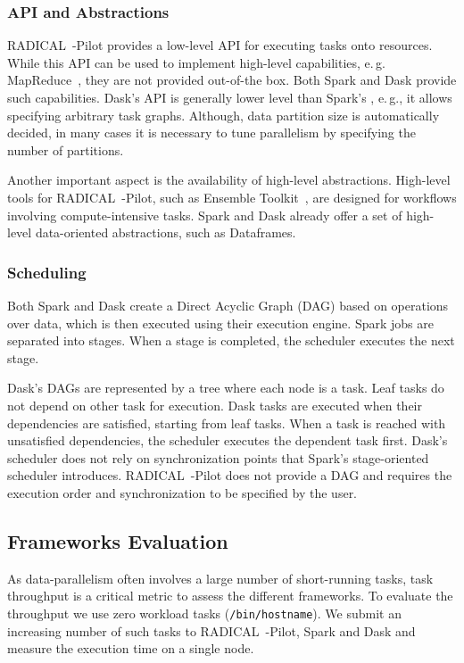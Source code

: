 \subsubsection*{API and Abstractions} 
RADICAL~-Pilot provides a low-level API for executing tasks onto resources.
While this API can be used to implement high-level capabilities, e.\,g. MapReduce~\cite{mantha2012pilot}, they are not provided out-of-the box.
Both Spark and Dask provide such capabilities.
Dask's API is generally lower level than Spark's , e.\,g., it allows specifying arbitrary task graphs.
Although, data partition size is automatically decided, in many cases it is necessary to tune parallelism by specifying the number of partitions.

Another important aspect is the availability of high-level abstractions.
High-level tools for RADICAL~-Pilot, such as Ensemble Toolkit~\cite{balasubramanian2018harnessing}, are designed for workflows involving compute-intensive tasks.
Spark and Dask already offer a set of high-level data-oriented abstractions, such as Dataframes.

\subsubsection*{Scheduling}
Both Spark and Dask create a Direct Acyclic Graph (DAG) based on operations over data, which is then executed using their execution engine.
Spark jobs are separated into stages.
When a stage is completed, the scheduler executes the next stage.

Dask's DAGs are represented by a tree where each node is a task.
Leaf tasks do not depend on other task for execution.
Dask tasks are executed when their dependencies are satisfied, starting from leaf tasks.
When a task is reached with unsatisfied dependencies, the scheduler executes the dependent task first.
Dask's scheduler does not rely on synchronization points that Spark's stage-oriented scheduler introduces.
RADICAL~-Pilot does not provide a DAG and requires the execution order and synchronization to be specified by the user.

\subsection{Frameworks Evaluation}
\label{sec:framework_eval}

As data-parallelism often involves a large number of short-running tasks, task throughput is a critical metric to assess the different frameworks.
To evaluate the throughput we use zero workload tasks (\texttt{/bin/hostname}).
We submit an increasing number of such tasks to RADICAL~-Pilot, Spark and Dask and measure the execution time on a single node.

